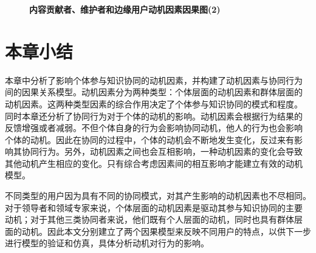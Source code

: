 \begin{figure}[!htb]
  \centering
  \caption{\small{\textbf{内容贡献者、维护者和边缘用户动机因素因果图(2)}}}
  \label{fig:motive3}
\end{figure}

\section{本章小结}

本章中分析了影响个体参与知识协同的动机因素，并构建了动机因素与协同行为
间的因果关系模型。动机因素分为两种类型：个体层面的动机因素和群体层面的
动机因素。这两种类型因素的综合作用决定了个体参与知识协同的模式和程度。
同时本章还分析了协同行为对于个体的动机的影响。动机因素会根据行为结果的
反馈增强或者减弱。不但个体自身的行为会影响协同动机，他人的行为也会影响
个体的动机。因此在协同的过程中，个体的动机会不断地发生变化，反过来有影
响其协同行为。另外，动机因素之间也会互相影响，一种动机因素的变化会导致
其他动机产生相应的变化。只有综合考虑因素间的相互影响才能建立有效的动机
模型。

不同类型的用户因为具有不同的协同模式，对其产生影响的动机因素也不尽相同。
对于领导者和领域专家来说，个体层面的动机因素是驱动其参与知识协同的主要
动机；对于其他三类协同者来说，他们既有个人层面的动机，同时也具有群体层
面的动机。因此本文分别建立了两个因果模型来反映不同用户的特点，以供下一步
进行模型的验证和仿真，具体分析动机对行为的影响。
